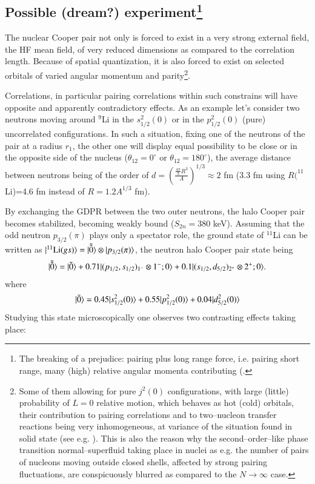 \begin{subappendices}
\subsection[Possible (dream?) experiment]{Possible (dream?) experiment\footnote{The breaking of a prejudice: pairing plus long range force, i.e. pairing short range, many (high) relative angular momenta contributing (\cite{Kisslinger:63,Soloviev:65,Mottelson:62,Mottelson:02}.}}
 The nuclear Cooper pair not only is forced to exist in a very strong external field, the HF mean field, of very reduced dimensions as compared to the correlation length. Because of spatial quantization, it is also forced to exist on selected orbitals of varied angular momentum and parity\footnote{Some of them allowing for pure $j^2(0)$ configurations, with large (little) probability of $L=0$ relative motion, which behaves as hot (cold) orbitals, their contribution to pairing correlations and to two--nucleon transfer reactions being very inhomogeneous, at variance of the situation found in solid state (see e.g. \cite{Broglia:05}). This is also the reason why the second--order--like phase transition normal--superfluid taking place in nuclei as e.g. the number of pairs of nucleons moving outside closed shells, affected by strong pairing fluctuations, are conspicuously blurred as compared to the $N\rightarrow\infty$ case.}.
 
 
 Correlations, in particular pairing correlations within such constrains will have opposite and apparently contradictory effects. As an example let's consider two neutrons moving around $^9$Li in the $s^2_{1/2}(0)$ or in the   $p^2_{1/2}(0)$ (pure) uncorrelated configurations. In such a situation, fixing one of the neutrons of the pair at a radius $r_1$, the other one will display equal possibility to be close or in the opposite side of the nucleus ($\theta_{12}=0^\circ$ or $\theta_{12}=180^\circ$), the average distance between neutrons being of the order of $d=\left(\frac{\frac{4\pi}{3}R^3}{A}\right)^{1/3}\approx 2$ fm (3.3 fm using $R(^{11}$Li)=4.6 fm instead of $R=1.2 A^{1/3}$ fm).
 
 By exchanging the GDPR between the two outer neutrons, the halo Cooper pair becomes stabilized, becoming weakly bound ($S_{2n}=380$ keV). Assuming that the odd neutron $p_{3/2}(\pi)$ plays only a spectator role, the ground state of $^{11}$Li can be written as $|{^{11}\text{Li}(gs)} \rangle=|{\tilde{\tilde 0}} \rangle\otimes|{p_{3/2}(\pi)} \rangle$, the neutron halo Cooper pair state being
    \begin{align}
|{\tilde{\tilde 0}} \rangle=|{\tilde 0} \rangle+0.71|{(p_{1/2},s_{1/2})_{1^-}\otimes 1^{-};0} \rangle+0.1|{(s_{1/2},d_{5/2})_{2^+}\otimes 2^{+};0} \rangle.
    \end{align}
    where
        \begin{align}
        |{\tilde 0} \rangle= 0.45|{s^2_{1/2}(0)} \rangle+0.55|{p^2_{1/2}(0)} \rangle+0.04|{d^2_{5/2}(0)} \rangle
        \end{align}
    Studying this state microscopically one observes two contrasting effects taking place:
    

\end{subappendices}
